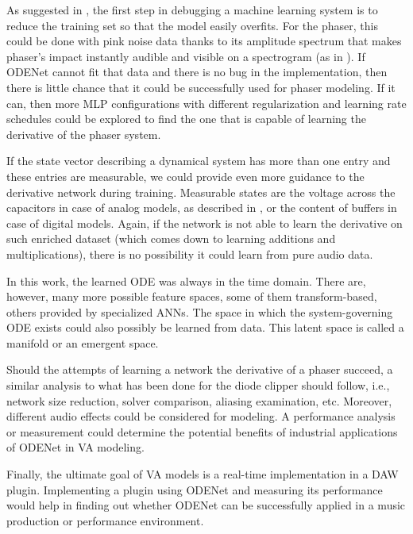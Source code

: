 As suggested in \cite{Bengio2012}, the first step in debugging a machine learning system is to reduce the training set so that the model easily overfits. For the phaser, this could be done with pink noise data thanks to its amplitude spectrum that makes phaser's impact instantly audible and visible on a spectrogram (as in ). If ODENet cannot fit that data and there is no bug in the implementation, then there is little chance that it could be successfully used for phaser modeling. If it can, then more \ac{MLP} configurations with different regularization and learning rate schedules could be explored to find the one that is capable of learning the derivative of the phaser system.

If the state vector describing a dynamical system has more than one entry and these entries are measurable, we could provide even more guidance to the derivative network during training. Measurable states are the voltage across the capacitors in case of analog models, as described in \cite{Parker2019}, or the content of buffers in case of digital models. Again, if the network is not able to learn the derivative on such enriched dataset (which comes down to learning additions and multiplications), there is no possibility it could learn from pure audio data.

In this work, the learned \ac{ODE} was always in the time domain. There are, however, many more possible feature spaces, some of them transform-based, others provided by specialized \acp{ANN}. %
The space in which the system-governing \ac{ODE} exists could also possibly be learned from data. This latent space is called a manifold \cite{Goodfellow-et-al-2016} or an emergent space. %

Should the attempts of learning a network the derivative of a phaser succeed, a similar analysis to what has been done for the diode clipper should follow, i.e., network size reduction, solver comparison, aliasing examination, etc. Moreover, different audio effects could be considered for modeling. A performance analysis or measurement could determine the potential benefits of industrial applications of ODENet in \ac{VA} modeling.

Finally, the ultimate goal of \ac{VA} models is a real-time implementation in a \ac{DAW} plugin. Implementing a plugin using ODENet and measuring its performance would help in finding out whether ODENet can be successfully applied in a music production or performance environment.
